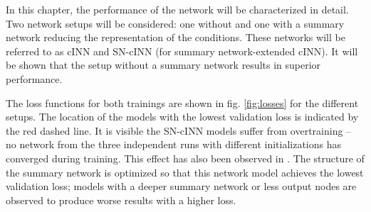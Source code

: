 
In this chapter, the performance of the network will be characterized in detail. Two network setups will be considered: one without and one with a summary network reducing the representation of the conditions. These networks will be referred to as cINN and SN-cINN (for summary network-extended cINN). It will be shown that the setup without a summary network results in superior performance. 


The loss functions for both trainings are shown in fig. \ref{fig:losses} for the different setups. The location of the models with the lowest validation loss is indicated by the red dashed line. It is visible the SN-cINN models suffer from overtraining -- no network from the three independent runs with different initializations has converged during training. This effect has also been observed in \cite{Ksoll_2020}. The structure of the summary network is optimized so that this network model achieves the lowest validation loss; models with a deeper summary network or less output nodes are observed to produce worse results with a higher loss.

